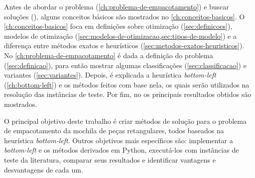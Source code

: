 Antes de abordar o problema (\autoref{ch:problema-de-empacotamento}) e buscar soluções
(), alguns conceitos básicos são mostrados no \autoref{ch:conceitos-basicos}.
O \autoref{ch:conceitos-basicos} foca em definições sobre otimização (\autoref{sec:definicoes}),
modelos de otimização (\cref{sec:modelos-de-otimizacao,sec:tipos-de-modelo}) e a diferença entre
métodos exatos e heurísticos (\cref{sec:metodos-exatos-heuristicos}).
No \autoref{ch:problema-de-empacotamento} é dada a definição do problema (\autoref{sec:definicao}),
para então mostrar algumas classificações (\autoref{sec:classificacao}) e variantes
(\autoref{sec:variantes}).
Depois, é explicada a heurística \textit{bottom-left} (\autoref{ch:bottom-left}) e os métodos feitos
com base nela, os quais serão utilizados na resolução das instâncias de teste.
Por fim, no  os principais resultados obtidos são mostrados.


O principal objetivo deste trabalho é criar métodos de solução para o problema de
empacotamento da mochila de peças retangulares, todos baseados na heurística \textit{bottom-left}.
Outros objetivos mais específicos são: implementar a \textit{bottom-left} e os métodos derivados em
Python, executá-los com instâncias de teste da literatura, comparar seus resultados e identificar
vantagens e desvantagens de cada um.
